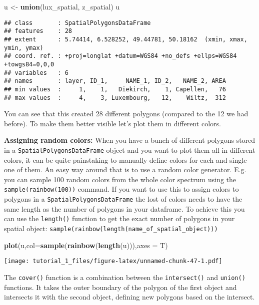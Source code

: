 \documentclass[]{article}
\newenvironment{Shaded}{\begin{snugshade}}{\end{snugshade}}
\newcommand{\DataTypeTok}[1]{\textcolor[rgb]{0.13,0.29,0.53}{#1}}
\newcommand{\KeywordTok}[1]{\textcolor[rgb]{0.13,0.29,0.53}{\textbf{#1}}}
\newcommand{\NormalTok}[1]{#1}
\newcommand{\StringTok}[1]{\textcolor[rgb]{0.31,0.60,0.02}{#1}}
\begin{document}
\begin{Shaded}
\begin{Highlighting}[]
\NormalTok{u <-}\StringTok{ }\KeywordTok{union}\NormalTok{(lux_spatial, z_spatial)}
\NormalTok{u}
\end{Highlighting}
\end{Shaded}

\begin{verbatim}
## class       : SpatialPolygonsDataFrame 
## features    : 28 
## extent      : 5.74414, 6.528252, 49.44781, 50.18162  (xmin, xmax, ymin, ymax)
## coord. ref. : +proj=longlat +datum=WGS84 +no_defs +ellps=WGS84 +towgs84=0,0,0 
## variables   : 6
## names       : layer, ID_1,     NAME_1, ID_2,   NAME_2, AREA 
## min values  :     1,    1,   Diekirch,    1, Capellen,   76 
## max values  :     4,    3, Luxembourg,   12,    Wiltz,  312
\end{verbatim}

You can see that this created 28 different polygons (compared to the 12
we had before). To make them better visible let's plot them in different
colors.

\textbf{Assigning random colors:} When you have a bunch of different
polygons stored in a \texttt{SpatialPolygonsDataFrame} object and you
want to plot them all in different colors, it can be quite painstaking
to manually define colors for each and single one of them. An easy way
around that is to use a random color generator. E.g. you can sample 100
random colors from the whole color spectrum using the
\texttt{sample(rainbow(100))} command. If you want to use this to assign
colors to polygons in a \texttt{SpatialPolygonsDataFrame} the lost of
colors needs to have the same length as the number of polygons in your
dataframe. To achieve this you can use the \texttt{length()} function to
get the exact number of polygons in your spatial object:
\texttt{sample(rainbow(length(name\_of\_spatial\_object)))}

\begin{Shaded}
\begin{Highlighting}[]
\KeywordTok{plot}\NormalTok{(u,}\DataTypeTok{col=}\KeywordTok{sample}\NormalTok{(}\KeywordTok{rainbow}\NormalTok{(}\KeywordTok{length}\NormalTok{(u))),}\DataTypeTok{axes =}\NormalTok{ T)}
\end{Highlighting}
\end{Shaded}

\texttt{[image: tutorial\_1\_files/figure-latex/unnamed-chunk-47-1.pdf]}

The \texttt{cover()} function is a combination between the
\texttt{intersect()} and \texttt{union()} functions. It takes the outer
boundary of the polygon of the first object and intersects it with the
second object, defining new polygons based on the intersect.
\end{document}
